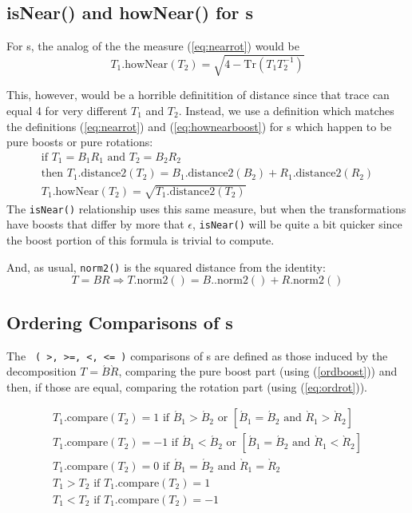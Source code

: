 \subsection{isNear() and howNear() for \protect\LT s}

For \LT s, the analog of the the \Rotation measure (\ref{eq:nearrot}) would be
\[
  T_1 \mbox{.howNear}(T_2) = \sqrt{ 4 - \mbox{Tr}(T_1 T_2^{-1}) }
\]

This, however, would be a horrible definitition of distance since that trace
can equal 4 for very different $T_1$ and $T_2$.  Instead, we use a definition
which matches the definitions (\ref{eq:nearrot}) and (\ref{eq:hownearboost})
for \LT s which happen to be pure boosts or pure rotations:
\begin{eqnarray}
\label{eq:isnearLT}
\mbox{if } T_1 = B_1 R_1 \mbox{ and } T_2 = B_2 R_2 \nonumber \\
\mbox{then } T_1\mbox{.distance2}(T_2) = 
	B_1\mbox{.distance2}(B_2) + R_1\mbox{.distance2}(R_2)
	\\
\nonumber
T_1\mbox{.howNear}(T_2) = \sqrt {T_1\mbox{.distance2}(T_2)}
\end{eqnarray}
\noindent
The {\tt isNear()} relationship uses this same measure, but when the
transformations have boosts that differ by more that $\epsilon$, {\tt isNear()}
will be quite a bit quicker since the boost portion of this formula is trivial
to compute.

And, as usual, {\tt norm2()} is the squared distance from the identity:
\begin{equation}
\label{eq:ltnorm2}
T = B R \Longrightarrow T\mbox{.norm2}() = 
	B.\mbox{.norm2}() + R\mbox{.norm2}()
\end{equation}

\subsection{Ordering Comparisons of \protect\LT s}

The \verb$ ( >, >=, <, <= )$ comparisons of \LT s are defined as those
induced by the decomposition $ T = \acute{B} \grave{R} $,
comparing the pure boost part
(using (\ref{ordboost})) and
then, if those are equal, comparing the rotation part (using (\ref{eq:ordrot})).

\begin{eqnarray}
\label{eq:ltorder}
  T_1\mbox{.compare}(T_2) = 1 \mbox{ if }
	\acute{B}_1 > \acute{B}_2 \mbox { or } \left[
	\acute{B}_1 = \acute{B}_2 \mbox { and }
	\grave{R}_1 > \grave{R}_2 \right] \\
\nonumber
  T_1\mbox{.compare}(T_2) = -1 \mbox{ if }
	\acute{B}_1 < \acute{B}_2 \mbox { or } \left[
	\acute{B}_1 = \acute{B}_2 \mbox { and }
	\grave{R}_1 < \grave{R}_2 \right] \\
\nonumber
  T_1\mbox{.compare}(T_2) = 0 \mbox{ if }
	\acute{B}_1 = \acute{B}_2 \mbox { and } 
	\grave{R}_1 = \grave{R}_2 
		\\
  T_1  > T_2 \mbox{ if } T_1\mbox{.compare}(T_2) = 1 \\
\nonumber
  T_1  < T_2 \mbox{ if } T_1\mbox{.compare}(T_2) = -1 
\end{eqnarray}

